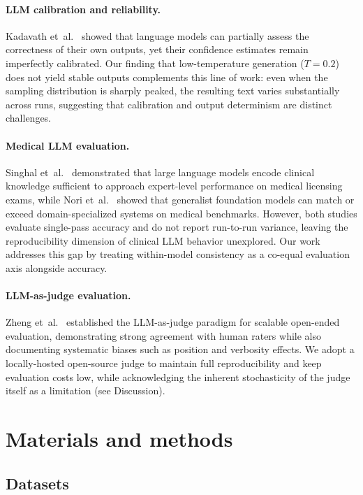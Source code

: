 \documentclass[10pt,letterpaper]{article}
\begin{document}
\paragraph{LLM calibration and reliability.}
Kadavath et~al.~\cite{kadavath2022calibration} showed that language
models can partially assess the correctness of their own outputs, yet
their confidence estimates remain imperfectly calibrated.
Our finding that low-temperature generation ($T{=}0.2$) does not yield
stable outputs complements this line of work: even when the sampling
distribution is sharply peaked, the resulting text varies substantially
across runs, suggesting that calibration and output determinism are
distinct challenges.

\paragraph{Medical LLM evaluation.}
Singhal et~al.~\cite{singhal2023large} demonstrated that large language
models encode clinical knowledge sufficient to approach expert-level
performance on medical licensing exams, while
Nori et~al.~\cite{nori2023gpt4med} showed that generalist foundation
models can match or exceed domain-specialized systems on medical
benchmarks.
However, both studies evaluate single-pass accuracy and do not report
run-to-run variance, leaving the reproducibility dimension of clinical
LLM behavior unexplored. Our work addresses this gap by treating
within-model consistency as a co-equal evaluation axis alongside
accuracy.

\paragraph{LLM-as-judge evaluation.}
Zheng et~al.~\cite{zheng2023judging} established the LLM-as-judge
paradigm for scalable open-ended evaluation, demonstrating strong
agreement with human raters while also documenting systematic biases
such as position and verbosity effects.
We adopt a locally-hosted open-source judge to maintain full
reproducibility and keep evaluation costs low, while acknowledging the
inherent stochasticity of the judge itself as a limitation
(see Discussion).

\section*{Materials and methods}

\subsection*{Datasets}
\end{document}
